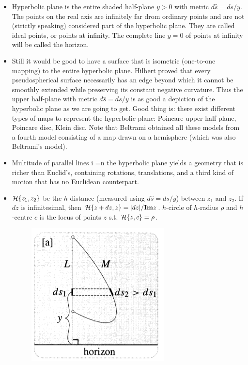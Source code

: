 \documentclass[12pt]{article}
\def\mc{\ensuremath\mathcal}
\def\mf{\ensuremath\mathbf}
\begin{document}
\begin{itemize}
    \item Hyperbolic plane is the entire shaded half-plane $y>0$ with metric $d\hat{s}=ds/y$. The points on the real axis are infinitely far drom ordinary points and are not (strictly speaking) considered part of the hyperbolic plane. They are called ideal points, or points at infinity. The complete line $y=0$ of points at infinity will be called the horizon.

    \item Still it would be good to have a surface that is isometric (one-to-one mapping) to the entire hyperbolic plane. Hilbert proved that every pseudospherical surface necessarily has an edge beyond which it cannot be smoothly extended while preserving its constant negative curvature. Thus the upper half-plane with metric $d\hat{s}=ds/y$ is as good a depiction of the hyperbolic plane as we are going to get. Good thing is: there exist different types of maps to represent the hyperbolic plane: Poincare upper half-plane, Poincare disc, Klein disc. Note that Beltrami obtained all these models from a fourth model consisting of a map drawn on a hemisphere (which was also Beltrami's model).

    \item Multitude of parallel lines i =n the hyperbolic plane yields a geometry that is richer than Euclid's, containing rotations, translations, and a third kind of motion that has no Euclidean counterpart.

    \item $\mc{H}\{z_1,z_2\}$ be the $h$-distance (measured using $d\hat{s}=ds/y$) between $z_1$ and $z_2$. If $dz$ is infinitesimal, then $\mc{H}\{z+dz,z\} = |dz|/\mf{Im}z$. $h$-circle of $h$-radius $\rho$ and $h$-centre $c$ is the locus of points $z$ s.t. $\mc{H}\{z,c\} = \rho$.

    \begin{figure}[h!]
        \centering
        \includegraphics[scale=0.7]{fig_15}
        \label{fig_15}
    \end{figure}


\end{itemize}
\end{document}
